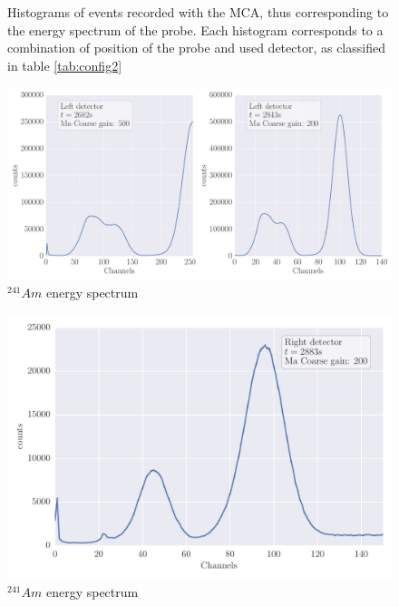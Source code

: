 \begin{figure}
\begin{subfigure}[b]{\picwidth}
        \caption{}
    \end{subfigure}
    \caption{
        Histograms of events recorded with the MCA, thus corresponding to the energy 
        spectrum of the probe. Each histogram corresponds to a combination of position 
        of the probe and used detector, as classified in table \ref{tab:config2}
        }
    \label{fig:measure2.1}
\end{figure}

\begin{figure}[htpb]
    \centering
    \includegraphics[width=\linewidth]{analysis/figures/plot6_12}
    \caption{$^{241}Am$ energy spectrum}
    \label{fig:plot6_13}
\end{figure}

\begin{figure}[htpb]
    \centering
    \includegraphics[width=0.8\linewidth]{analysis/figures/plot6_3}
    \caption{$^{241}Am$ energy spectrum}
    \label{fig:plot6_13}
\end{figure}
\clearpage
